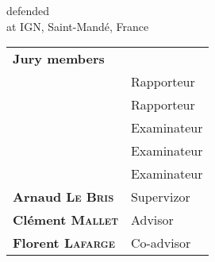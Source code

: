 \begin{titlepage}
\begin{center}
        \vspace*{10mm}

        defended  \\
        at IGN, Saint-Mand\'e, France

        \vfill

        \begin{tabular}{l l}
            \large \textbf{Jury members} & \\
            & Rapporteur \\
            & Rapporteur \\
            & Examinateur \\
            & Examinateur \\
            & Examinateur \\
            \textbf{Arnaud \textsc{Le Bris}} & Supervizor \\
            \textbf{Clément \textsc{Mallet}} & Advisor \\
            \textbf{Florent \textsc{Lafarge}} & Co-advisor \\
        \end{tabular}
    \end{center}
\end{titlepage}
